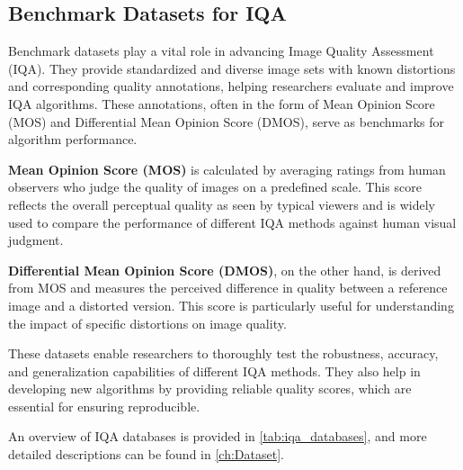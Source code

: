 \subsection{Benchmark Datasets for IQA}
\label{sub:BenchmarkDatasetsIQA}
Benchmark datasets play a vital role in advancing Image Quality Assessment (IQA). They provide standardized and diverse image sets with known distortions and corresponding quality annotations, helping researchers evaluate and improve IQA algorithms. These annotations, often in the form of Mean Opinion Score (MOS) and Differential Mean Opinion Score (DMOS), serve as benchmarks for algorithm performance. \par
\vspace{\baselineskip}
\noindent
\textbf{Mean Opinion Score (MOS)} is calculated by averaging ratings from human observers who judge the quality of images on a predefined scale. This score reflects the overall perceptual quality as seen by typical viewers and is widely used to compare the performance of different IQA methods against human visual judgment. \par
\vspace{\baselineskip}
\noindent
\textbf{Differential Mean Opinion Score (DMOS)}, on the other hand, is derived from MOS and measures the perceived difference in quality between a reference image and a distorted version. This score is particularly useful for understanding the impact of specific distortions on image quality. \par
\vspace{\baselineskip}
\noindent
These datasets enable researchers to thoroughly test the robustness, accuracy, and generalization capabilities of different IQA methods. They also help in developing new algorithms by providing reliable quality scores, which are essential for ensuring reproducible. \par
\noindent
An overview of IQA databases is provided in \autoref{tab:iqa_databases}, and more detailed descriptions can be found in \autoref{ch:Dataset}.

